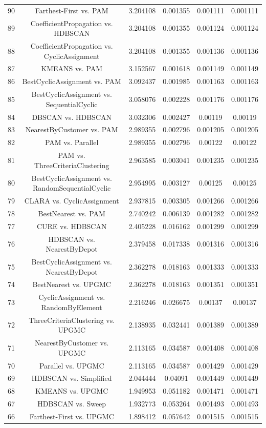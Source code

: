 \documentclass[a4paper,10pt]{article}
\begin{document}
\begin{landscape}
\begin{table}[!htp]
\begin{tabular}{cccccc}
90&Farthest-First vs. PAM&3.204108&0.001355&0.001111&0.001111\\
89&CoefficientPropagation vs. HDBSCAN&3.204108&0.001355&0.001124&0.001124\\
88&CoefficientPropagation vs. CyclicAssignment&3.204108&0.001355&0.001136&0.001136\\
87&KMEANS vs. PAM&3.152567&0.001618&0.001149&0.001149\\
86&BestCyclicAssignment vs. PAM&3.092437&0.001985&0.001163&0.001163\\
85&BestCyclicAssignment vs. SequentialCyclic&3.058076&0.002228&0.001176&0.001176\\
84&DBSCAN vs. HDBSCAN&3.032306&0.002427&0.00119&0.00119\\
83&NearestByCustomer vs. PAM&2.989355&0.002796&0.001205&0.001205\\
82&PAM vs. Parallel&2.989355&0.002796&0.00122&0.00122\\
81&PAM vs. ThreeCriteriaClustering&2.963585&0.003041&0.001235&0.001235\\
80&BestCyclicAssignment vs. RandomSequentialCyclic&2.954995&0.003127&0.00125&0.00125\\
79&CLARA vs. CyclicAssignment&2.937815&0.003305&0.001266&0.001266\\
78&BestNearest vs. PAM&2.740242&0.006139&0.001282&0.001282\\
77&CURE vs. HDBSCAN&2.405228&0.016162&0.001299&0.001299\\
76&HDBSCAN vs. NearestByDepot&2.379458&0.017338&0.001316&0.001316\\
75&BestCyclicAssignment vs. NearestByDepot&2.362278&0.018163&0.001333&0.001333\\
74&BestNearest vs. UPGMC&2.362278&0.018163&0.001351&0.001351\\
73&CyclicAssignment vs. RandomByElement&2.216246&0.026675&0.00137&0.00137\\
72&ThreeCriteriaClustering vs. UPGMC&2.138935&0.032441&0.001389&0.001389\\
71&NearestByCustomer vs. UPGMC&2.113165&0.034587&0.001408&0.001408\\
70&Parallel vs. UPGMC&2.113165&0.034587&0.001429&0.001429\\
69&HDBSCAN vs. Simplified&2.044444&0.04091&0.001449&0.001449\\
68&KMEANS vs. UPGMC&1.949953&0.051182&0.001471&0.001471\\
67&HDBSCAN vs. Sweep&1.932773&0.053264&0.001493&0.001493\\
66&Farthest-First vs. UPGMC&1.898412&0.057642&0.001515&0.001515\\

\end{tabular}
\end{table}
\end{landscape}
\end{document}
